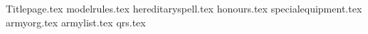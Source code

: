 \documentclass[a4paper,10pt]{article}
\begin{document}
{Titlepage.tex}
{modelrules.tex}
\newpage
{hereditaryspell.tex}
\additionalspacebeforemaintitle{}
{honours.tex}
\newpage
{specialequipment.tex}
\newpage
{armyorg.tex}
{armylist.tex}
\newpage
{qrs.tex}
\end{document}
